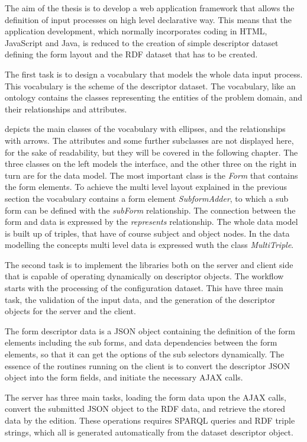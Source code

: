 The aim of the thesis is to develop a web application framework that allows the definition of input processes on high level declarative way. This means that the application development, which normally incorporates coding in HTML, JavaScript and Java, is reduced to the creation of simple descriptor dataset defining the form layout and the RDF dataset that has to be created.

The first task is to design a vocabulary that models the whole data input process. This vocabulary is the scheme of the descriptor dataset. The vocabulary, like an ontology contains the classes representing the entities of the problem domain, and their relationships and attributes.


 depicts the main classes of the vocabulary with ellipses, and the relationships with arrows. The attributes and some further subclasses are not displayed here, for the sake of readability, but they will be covered in the following chapter. The three classes on the left models the interface, and the other three on the right in turn are for the data model. The most important class is the \textit{Form} that contains the form elements. To achieve the multi level layout explained in the previous section the vocabulary contains a form element \textit{SubformAdder}, to which a sub form can be defined with the \textit{subForm} relationship. The connection between the form and data is expressed by the \textit{represents} relationship. The whole data model is built up of triples, that have of course subject and object nodes. In the data modelling the concepts multi level data is expressed wuth the class \textit{MultiTriple}. 

The second task is to implement the libraries both on the server and client side that is capable of operating dynamically on descriptor objects. The workflow starts with the processing of the configuration dataset. This have three main task, the validation of the input data, and the generation of the descriptor objects for the server and the client.



The form descriptor data is a JSON object containing the definition of the form elements including the sub forms, and data dependencies between the form elements, so that it can get the options of the sub selectors dynamically. The essence of the routines running on the client is to convert the descriptor JSON object into the form fields, and initiate the necessary AJAX calls.

The server has three main tasks, loading the form data upon the AJAX calls, convert the submitted JSON object to the RDF data, and retrieve the stored data by the edition. These operations requires SPARQL queries and RDF triple strings, which all is generated automatically from the dataset descriptor object.

